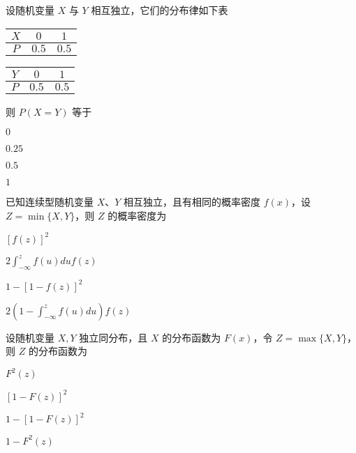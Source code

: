 \documentclass{exam-zh}
\begin{document}
\begin{question}
  设随机变量 $X$ 与 $Y$ 相互独立，它们的分布律如下表

  \begin{minipage}{0.5\textwidth}
    \centering
    \begin{tabular}{|c|c|c|}
    \hline
    $X$ & $0$ & $1$ \\
    \hline
    $P$ & $0.5$ & $0.5$ \\
    \hline
    \end{tabular}
  \end{minipage}
  \begin{minipage}{0.5\textwidth}
    \centering
    \begin{tabular}{|c|c|c|}
    \hline
    $Y$ & $0$ & $1$ \\
    \hline
    $P$ & $0.5$ & $0.5$ \\
    \hline
    \end{tabular}
  \end{minipage}

  则 $P(X=Y)$ 等于 \paren[C]
  \begin{choices}
    \item $0$  
    \item $0.25$  
    \item $0.5$  
    \item $1$  
  \end{choices}
\end{question}

\begin{question}
  已知连续型随机变量 $X$、$Y$ 相互独立，且有相同的概率密度 $f(x)$，设 $Z = \min\{X, Y\}$，则 $Z$ 的概率密度为 \paren[D]
  \begin{choices}
    \item $[f(z)]^2$  
    \item $2\int_{-\infty}^z f(u)du f(z)$  
    \item $1 - [1 - f(z)]^2$  
    \item $2(1 - \int_{-\infty}^z f(u)du)f(z)$  
  \end{choices}
\end{question}

\begin{question}
  设随机变量 $X, Y$ 独立同分布，且 $X$ 的分布函数为 $F(x)$，令 $Z = \max\{X, Y\}$，则 $Z$ 的分布函数为 \paren[A]
  \begin{choices}
    \item $F^2(z)$  
    \item $[1 - F(z)]^2$  
    \item $1 - [1 - F(z)]^2$  
    \item $1 - F^2(z)$  
  \end{choices}
\end{question}
\end{document}
